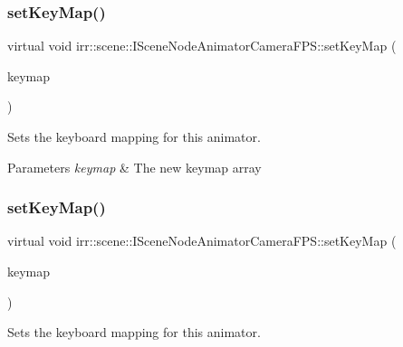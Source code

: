 \subsubsection{\texorpdfstring{set\+Key\+Map()}{setKeyMap()}\hspace{0.1cm}{\footnotesize\ttfamily [3/4]}}
{\footnotesize\ttfamily virtual void irr\+::scene\+::\+I\+Scene\+Node\+Animator\+Camera\+F\+P\+S\+::set\+Key\+Map (\begin{DoxyParamCaption}\item[{const \hyperlink{classirr_1_1core_1_1array}{core\+::array}$<$ \hyperlink{structirr_1_1SKeyMap}{S\+Key\+Map} $>$ \&}]{keymap }\end{DoxyParamCaption})\hspace{0.3cm}{\ttfamily [pure virtual]}}



Sets the keyboard mapping for this animator. 


\begin{DoxyParams}{Parameters}
{\em keymap} & The new keymap array \\
\hline
\end{DoxyParams}
\mbox{\label{classirr_1_1scene_1_1ISceneNodeAnimatorCameraFPS_a9a76aeafb9fe79a13b7b128b3eb3b103}} 
\subsubsection{\texorpdfstring{set\+Key\+Map()}{setKeyMap()}\hspace{0.1cm}{\footnotesize\ttfamily [4/4]}}
{\footnotesize\ttfamily virtual void irr\+::scene\+::\+I\+Scene\+Node\+Animator\+Camera\+F\+P\+S\+::set\+Key\+Map (\begin{DoxyParamCaption}\item[{const \hyperlink{classirr_1_1core_1_1array}{core\+::array}$<$ \hyperlink{structirr_1_1SKeyMap}{S\+Key\+Map} $>$ \&}]{keymap }\end{DoxyParamCaption})\hspace{0.3cm}{\ttfamily [pure virtual]}}



Sets the keyboard mapping for this animator. 


